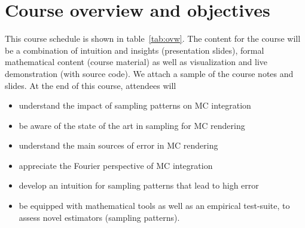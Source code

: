 \documentclass{acmsiggraph}
\begin{document}
\section{Course overview and objectives}
This course schedule is shown in table~\ref{tab:ovw}. The content for the course will be a combination of intuition and insights (presentation slides), formal mathematical content (course material) as well as visualization and live demonstration (with source code). We attach a sample of the course notes and slides.
At the end of this course, attendees will 
\begin{itemize}[noitemsep,topsep=-1em,leftmargin=*]
\item understand the impact of sampling patterns on MC integration
\item be aware of the state of the art in sampling for MC rendering
\item understand the main sources of error in MC rendering 
\item appreciate the Fourier perspective of MC integration
\item develop an intuition for sampling patterns that lead to high error
\item be equipped with mathematical tools as well as an empirical test-suite, to assess novel estimators (sampling patterns).
\end{itemize}






\end{document}
